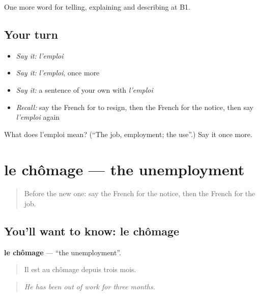 \begin{grammarlens}[title={What you've built}]
One more word for telling, explaining and describing at B1.
\end{grammarlens}

\subsection*{Your turn}
\begin{itemize}
\raggedright
  \item \emph{Say it:} \emph{l'emploi}
  \item \emph{Say it:} \emph{l'emploi}, once more
  \item \emph{Say it:} a sentence of your own with \emph{l'emploi}
  \item \emph{Recall:} say the French for to resign, then the French for the notice, then say \emph{l'emploi} again
\end{itemize}

\begin{tcolorbox}[breakable,colback=teal!4,colframe=teal!35!black,title={Before you move on}]
What does l'emploi mean? (\textquotedblleft{}The job, employment; the use\textquotedblright{}.) Say it once more.
\end{tcolorbox}
\section[le chômage]{le chômage — the unemployment}

\label{lesson:FR-C356-chomage}



\begin{quote}
Before the new one: say the French for the notice, then the French for the job.
\end{quote}

\subsection*{You'll want to know: le chômage}
\textbf{le chômage} — \textquotedblleft{}the unemployment\textquotedblright{}.

\begin{quote}
Il est au chômage depuis trois mois.
\end{quote}

\begin{quote}
\emph{He has been out of work for three months.}
\end{quote}


